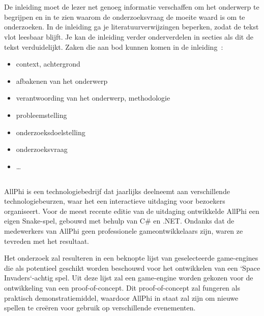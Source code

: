 
\chapter{}%
\label{ch:inleiding}

De inleiding moet de lezer net genoeg informatie verschaffen om het onderwerp te begrijpen en in te zien waarom de onderzoeksvraag de moeite waard is om te onderzoeken. In de inleiding ga je literatuurverwijzingen beperken, zodat de tekst vlot leesbaar blijft. Je kan de inleiding verder onderverdelen in secties als dit de tekst verduidelijkt. Zaken die aan bod kunnen komen in de inleiding~\autocite{Pollefliet2011}:

\begin{itemize}
  \item context, achtergrond
  \item afbakenen van het onderwerp
  \item verantwoording van het onderwerp, methodologie
  \item probleemstelling
  \item onderzoeksdoelstelling
  \item onderzoeksvraag
  \item \ldots
\end{itemize}

\section{}%
\label{sec:probleemstelling}

AllPhi is een technologiebedrijf dat jaarlijks deelneemt aan verschillende technologiebeurzen, waar het een interactieve uitdaging voor bezoekers organiseert. Voor de meest recente editie van de uitdaging ontwikkelde AllPhi een eigen Snake-spel, gebouwd met behulp van C\# en .NET. Ondanks dat de medewerkers van AllPhi geen professionele gameontwikkelaars zijn, waren ze tevreden met het resultaat.

Het onderzoek zal resulteren in een beknopte lijst van geselecteerde game-engines die als potentieel geschikt worden beschouwd voor het ontwikkelen van een `Space Invaders`-achtig spel. Uit deze lijst zal een game-engine worden gekozen voor de ontwikkeling van een proof-of-concept. Dit proof-of-concept zal fungeren als praktisch demonstratiemiddel, waardoor AllPhi in staat zal zijn om nieuwe spellen te creëren voor gebruik op verschillende evenementen.



